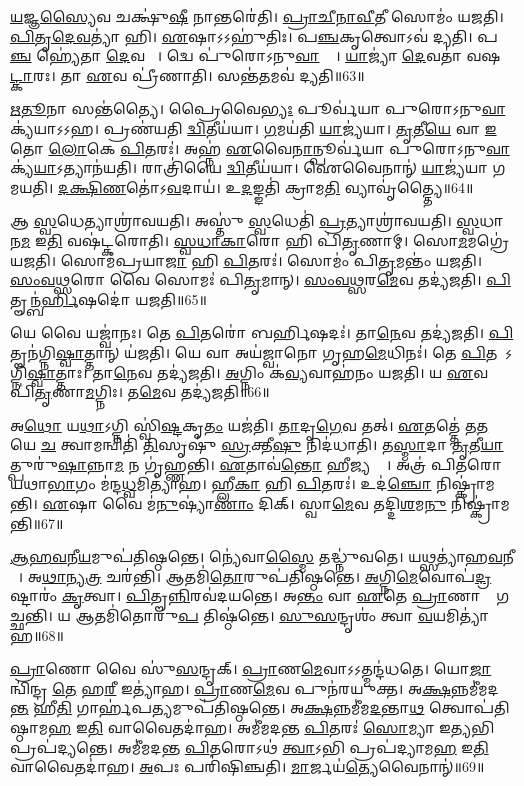 \ul{𑌯}𑌜𑍍𑌞\ul{𑌸𑍍𑌯𑍈}𑌵 𑌚𑌕𑍍𑌷𑍁॑\ul{𑌷𑍀} 𑌨𑌾𑌨𑍍𑌤𑌰𑍇॑𑌤𑌿।
\ul{𑌪𑍍𑌰𑌾}\ul{𑌚𑍀}\ul{𑌨𑌾}\ul{𑌵𑍀}𑌤𑍀 𑌸𑍋𑌮𑌂॑ 𑌯𑌜𑌤𑌿।
\ul{𑌪𑌿}\ul{𑌤𑍃}\ul{𑌦𑍇}\ul{𑌵}𑌤𑍍𑌯𑌾॑ 𑌹𑌿।
\ul{𑌏}𑌷𑌾𑌽𑌽𑌹𑍁॑𑌤𑌿𑌃।
𑌪\ul{𑌞𑍍𑌚}𑌕𑍃𑌤𑍍𑌵𑍋𑌽𑌵॑ 𑌦𑍍𑌯𑌤𑌿।
𑌪\ul{𑌞𑍍𑌚} 𑌹𑍍𑌯𑍇॑𑌤𑌾 \ul{𑌦𑍇}𑌵𑌤𑌾𑌃᳚।
𑌦𑍍𑌵𑍇 𑌪𑍁॑𑌰𑍋\-𑌽𑌨𑍁\ul{𑌵𑌾}𑌕𑍍𑌯𑍇᳚।
\ul{𑌯𑌾}𑌜𑍍𑌯𑌾॑ \ul{𑌦𑍇}𑌵𑌤𑌾॑ 𑌵𑌷\ul{𑌟𑍍𑌕𑌾}𑌰𑌃।
𑌤𑌾 \ul{𑌏}𑌵 𑌪𑍍𑌰𑍀॑𑌣𑌾𑌤𑌿।
𑌸𑌨𑍍𑌤॑\ul{𑌤}𑌮𑌵॑ 𑌦𑍍𑌯𑌤𑌿॥63॥

\ul{𑌋}\ul{𑌤𑍂}𑌨𑌾 𑌸𑌨𑍍𑌤॑𑌤𑍍𑌯𑍈।
𑌪𑍍𑌰𑍈𑌵𑍈\ul{𑌭𑍍𑌯𑌃} 𑌪𑍂𑌰𑍍𑌵॑𑌯𑌾 𑌪𑍁𑌰𑍋\-𑌽𑌨𑍁\ul{𑌵𑌾}𑌕𑍍𑌯॑𑌯𑌾𑌽𑌽𑌹।
𑌪𑍍𑌰𑌣॑𑌯𑌤𑌿 \ul{𑌦𑍍𑌵𑌿}𑌤𑍀𑌯॑𑌯𑌾।
\ul{𑌗}𑌮𑌯॑𑌤𑌿 \ul{𑌯𑌾}𑌜𑍍𑌯॑𑌯𑌾।
\ul{𑌤𑍃}𑌤𑍀\ul{𑌯𑍇} 𑌵𑌾 \ul{𑌇}𑌤𑍋 \ul{𑌲𑍋}𑌕𑍇 \ul{𑌪𑌿}𑌤𑌰𑌃॑।
𑌅𑌹𑍍𑌨॑ \ul{𑌏}𑌵𑍈\ul{𑌨𑌾}𑌨𑍍𑌪𑍂𑌰𑍍𑌵॑𑌯𑌾 𑌪𑍁𑌰𑍋\-𑌽𑌨𑍁\ul{𑌵𑌾}𑌕𑍍𑌯॑\ul{𑌯𑌾}\-𑌽𑌤𑍍𑌯𑌾𑌨॑𑌯𑌤𑌿।
𑌰𑌾𑌤𑍍𑌰𑌿॑𑌯𑍈 \ul{𑌦𑍍𑌵𑌿}𑌤𑍀𑌯॑𑌯𑌾।
𑌐𑌵𑍈𑌨𑌾𑌨𑍍॑ \ul{𑌯𑌾}𑌜𑍍𑌯॑𑌯𑌾 𑌗𑌮𑌯𑌤𑌿।
\ul{𑌦}\ul{𑌕𑍍𑌷𑌿}\ul{𑌣}𑌤𑍋॑\-𑌽\ul{𑌵}𑌦𑌾𑌯॑।
𑌉\ul{𑌦}𑌙𑍍𑌙𑌤𑌿॑ 𑌕𑍍𑌰𑌾𑌮\ul{𑌤𑌿} 𑌵𑍍𑌯𑌾𑌵𑍃॑𑌤𑍍𑌤𑍍𑌯𑍈॥64॥

𑌆 \ul{𑌸𑍍𑌵}𑌧𑍇𑌤𑍍𑌯𑌾𑌶𑍍𑌰𑌾॑𑌵𑌯𑌤𑌿।
𑌅𑌸𑍍𑌤𑍁॑ \ul{𑌸𑍍𑌵}𑌧𑍇𑌤𑌿॑ \ul{𑌪𑍍𑌰}𑌤𑍍𑌯𑌾𑌶𑍍𑌰𑌾॑𑌵𑌯𑌤𑌿।
\ul{𑌸𑍍𑌵}𑌧𑌾 𑌨\ul{𑌮} 𑌇\ul{𑌤𑌿} 𑌵𑌷॑𑌟𑍍𑌕𑌰𑍋𑌤𑌿।
\ul{𑌸𑍍𑌵}\ul{𑌧𑌾}\ul{𑌕𑌾}𑌰𑍋 𑌹𑌿 𑌪𑌿॑\ul{𑌤𑍃}𑌣𑌾𑌮𑍍।
𑌸𑍋\ul{𑌮}𑌮𑌗𑍍𑌰𑍇॑ 𑌯𑌜𑌤𑌿।
𑌸𑍋𑌮॑𑌪𑍍𑌰𑌯𑌾\ul{𑌜𑌾} 𑌹𑌿 \ul{𑌪𑌿}𑌤𑌰𑌃॑।
𑌸𑍋𑌮𑌂॑ 𑌪𑌿\ul{𑌤𑍃}𑌮𑌨𑍍𑌤𑌂॑ 𑌯𑌜𑌤𑌿।
\ul{𑌸𑌂}\ul{𑌵}\ul{𑌥𑍍𑌸}𑌰𑍋 𑌵𑍈 𑌸𑍋𑌮𑌃॑ 𑌪𑌿\ul{𑌤𑍃}𑌮𑌾𑌨𑍍।
\ul{𑌸𑌂}\ul{𑌵}\ul{𑌥𑍍𑌸}𑌰\ul{𑌮𑍇}𑌵 𑌤𑌦𑍍𑌯॑𑌜𑌤𑌿।
\ul{𑌪𑌿}𑌤𑍄𑌨𑍍𑌬॑\ul{𑌰𑍍𑌹𑌿}𑌷𑌦𑍋॑ 𑌯𑌜𑌤𑌿॥65॥

𑌯𑍇 𑌵𑍈 𑌯𑌜𑍍𑌵𑌾॑𑌨𑌃।
𑌤𑍇 \ul{𑌪𑌿}𑌤𑌰𑍋॑ 𑌬𑌰𑍍\mbox{}\ul{𑌹𑌿}𑌷𑌦𑌃॑।
𑌤𑌾\ul{𑌨𑍇}𑌵 𑌤𑌦𑍍𑌯॑𑌜𑌤𑌿।
\ul{𑌪𑌿}𑌤𑍄𑌨॑𑌗𑍍𑌨𑌿\ul{𑌷𑍍𑌵𑌾}𑌤𑍍𑌤𑌾𑌨𑍍 𑌯॑𑌜𑌤𑌿।
𑌯𑍇 𑌵𑌾 𑌅𑌯॑𑌜𑍍𑌵𑌾𑌨𑍋 𑌗𑍃𑌹\ul{𑌮𑍇}𑌧𑌿𑌨𑌃॑।
𑌤𑍇 \ul{𑌪𑌿}𑌤𑌰𑍋᳚\-𑌽𑌗𑍍𑌨𑌿\ul{𑌷𑍍𑌵𑌾}𑌤𑍍𑌤𑌾𑌃।
𑌤𑌾\ul{𑌨𑍇}𑌵 𑌤𑌦𑍍𑌯॑𑌜𑌤𑌿।
\ul{𑌅}𑌗𑍍𑌨𑌿𑌂 𑌕॑\ul{𑌵𑍍𑌯}𑌵𑌾𑌹॑𑌨𑌂 𑌯𑌜𑌤𑌿।
𑌯 \ul{𑌏}𑌵 𑌪𑌿॑\ul{𑌤𑍃}𑌣𑌾\ul{𑌮}𑌗𑍍𑌨𑌿𑌃।
𑌤\ul{𑌮𑍇}𑌵 𑌤𑌦𑍍𑌯॑𑌜𑌤𑌿॥66॥

𑌅\ul{𑌥𑍋} 𑌯\ul{𑌥𑌾}\-𑌽𑌗𑍍𑌨𑌿 𑌸𑍍𑌵𑌿॑\ul{𑌷𑍍𑌟}𑌕𑍃\ul{𑌤𑌂} 𑌯𑌜॑𑌤𑌿।
\ul{𑌤𑌾}𑌦𑍃\ul{𑌗𑍇}𑌵 𑌤𑌤𑍍।
\ul{𑌏}𑌤𑌤𑍍𑌤𑍇॑ 𑌤\ul{𑌤} 𑌯𑍇 \ul{𑌚} 𑌤𑍍𑌵𑌾𑌮𑌨𑍍𑌵𑌿𑌤𑌿॑ \ul{𑌤𑌿}𑌸𑍃𑌷𑍁॑ \ul{𑌸𑍍𑌰}𑌕𑍍𑌤𑍀\ul{𑌷𑍁} 𑌨𑌿𑌦॑𑌧𑌾𑌤𑌿।
𑌤\ul{𑌸𑍍𑌮𑌾}𑌦𑌾 \ul{𑌤𑍃}𑌤𑍀\ul{𑌯𑌾}𑌤𑍍𑌪𑍁𑌰𑍁॑\ul{𑌷𑌾}𑌨𑍍𑌨𑌾\ul{𑌮} 𑌨 𑌗𑍃॑𑌹𑍍𑌣𑌨𑍍𑌤𑌿।
\ul{𑌏}𑌤𑌾𑌵॑\ul{𑌨𑍍𑌤𑍋} 𑌹𑍀𑌜𑍍𑌯𑌨𑍍𑌤𑍇᳚।
𑌅𑌤𑍍𑌰॑ 𑌪𑌿𑌤𑌰𑍋 𑌯𑌥𑌾\ul{𑌭𑌾}𑌗𑌂 𑌮॑𑌨𑍍𑌦\ul{𑌧𑍍𑌵}𑌮𑌿𑌤𑍍𑌯𑌾॑𑌹।
𑌹𑍍𑌲𑍀\ul{𑌕𑌾} 𑌹𑌿 \ul{𑌪𑌿}𑌤𑌰𑌃॑।
𑌉𑌦॑\ul{𑌞𑍍𑌚𑍋} 𑌨𑌿𑌷𑍍𑌕𑍍𑌰𑌾॑𑌮𑌨𑍍𑌤𑌿।
\ul{𑌏}𑌷𑌾 𑌵𑍈 𑌮॑\ul{𑌨𑍁}𑌷𑍍𑌯𑌾॑\ul{𑌣𑌾𑌂} 𑌦𑌿𑌕𑍍।
𑌸𑍍𑌵𑌾\ul{𑌮𑍇}𑌵 𑌤𑌦𑍍𑌦𑌿\ul{𑌶}𑌮\ul{𑌨𑍁} 𑌨𑌿𑌷𑍍𑌕𑍍𑌰𑌾॑𑌮𑌨𑍍𑌤𑌿॥67॥

\ul{𑌆}\ul{𑌹}\ul{𑌵}𑌨𑍀\ul{𑌯}𑌮𑍁𑌪॑𑌤𑌿𑌷𑍍𑌠𑌨𑍍𑌤𑍇।
𑌨𑍍𑌯𑍇॑𑌵𑌾\ul{𑌸𑍍𑌮𑍈} 𑌤𑌦𑍍𑌧𑍍𑌨𑍁॑𑌵𑌤𑍇।
𑌯\ul{𑌥𑍍𑌸}𑌤𑍍𑌯𑌾॑𑌹\ul{𑌵}𑌨𑍀𑌯𑍇᳚।
𑌅\ul{𑌥𑌾}𑌨𑍍𑌯\ul{𑌤𑍍𑌰} 𑌚𑌰॑𑌨𑍍𑌤𑌿।
𑌆𑌤𑌮𑌿॑\ul{𑌤𑍋}𑌰𑍁𑌪॑𑌤𑌿𑌷𑍍𑌠𑌨𑍍𑌤𑍇।
\ul{𑌅}𑌗𑍍𑌨𑌿\ul{𑌮𑍇}𑌵𑍋𑌪॑\ul{𑌦𑍍𑌰}𑌷𑍍𑌟𑌾𑌰𑌂॑ \ul{𑌕𑍃}𑌤𑍍𑌵𑌾।
\ul{𑌪𑌿}𑌤𑍄\ul{𑌨𑍍𑌨𑌿}𑌰𑌵॑𑌦𑌯𑌨𑍍𑌤𑍇।
𑌅\ul{𑌨𑍍𑌤𑌂} 𑌵𑌾 \ul{𑌏}𑌤𑍇 \ul{𑌪𑍍𑌰𑌾}𑌣𑌾𑌨𑌾𑌂᳚ 𑌗𑌚𑍍𑌛𑌨𑍍𑌤𑌿।
𑌯 𑌆𑌤𑌮𑌿॑𑌤𑍋𑌰𑍁\ul{𑌪} 𑌤𑌿𑌷𑍍𑌠॑𑌨𑍍𑌤𑍇।
\ul{𑌸𑍁}\ul{𑌸}𑌨𑍍𑌦𑍃𑌶𑌂॑ 𑌤𑍍𑌵𑌾 \ul{𑌵}𑌯𑌮𑌿𑌤𑍍𑌯𑌾॑𑌹॥68॥

\ul{𑌪𑍍𑌰𑌾}𑌣𑍋 𑌵𑍈 𑌸𑍁॑\ul{𑌸}𑌨𑍍𑌦𑍃𑌕𑍍।
\ul{𑌪𑍍𑌰𑌾}𑌣\ul{𑌮𑍇}𑌵𑌾𑌽𑌽𑌤𑍍𑌮𑌨𑍍𑌦॑𑌧𑌤𑍇।
𑌯𑍋\ul{𑌜𑌾} 𑌨𑍍𑌵𑌿॑𑌨𑍍𑌦𑍍𑌰 \ul{𑌤𑍇} 𑌹\ul{𑌰𑍀} 𑌇𑌤𑍍𑌯𑌾॑𑌹।
\ul{𑌪𑍍𑌰𑌾}𑌣\ul{𑌮𑍇}𑌵 𑌪𑍁𑌨॑𑌰𑌯𑍁𑌕𑍍𑌤।
𑌅\ul{𑌕𑍍𑌷}𑌨𑍍𑌨𑌮𑍀॑𑌮𑌦\ul{𑌨𑍍𑌤} 𑌹𑍀\ul{𑌤𑌿} 𑌗𑌾𑌰𑍍\mbox{}𑌹॑𑌪\ul{𑌤𑍍𑌯}𑌮𑍁𑌪॑𑌤𑌿𑌷𑍍𑌠𑌨𑍍𑌤𑍇।
𑌅\ul{𑌕𑍍𑌷}𑌨𑍍𑌨𑌮𑍀॑𑌮\ul{𑌦}𑌨𑍍𑌤𑌾\ul{𑌥} 𑌤𑍍𑌵𑍋𑌪॑𑌤𑌿𑌷𑍍𑌠𑌾𑌮\ul{𑌹} 𑌇\ul{𑌤𑌿} 𑌵𑌾𑌵𑍈𑌤𑌦𑌾॑𑌹।
𑌅𑌮𑍀॑𑌮𑌦𑌨𑍍𑌤 \ul{𑌪𑌿}𑌤𑌰𑌃॑ \ul{𑌸𑍋}𑌮𑍍𑌯𑌾 𑌇\ul{𑌤𑍍𑌯}𑌭𑌿 𑌪𑍍𑌰𑌪॑𑌦𑍍𑌯𑌨𑍍𑌤𑍇।
𑌅𑌮𑍀॑𑌮𑌦𑌨𑍍𑌤 \ul{𑌪𑌿}𑌤𑌰𑍋𑌽𑌥॑ \ul{𑌤𑍍𑌵𑌾}𑌽𑌭𑌿 𑌪𑍍𑌰𑌪॑𑌦𑍍𑌯𑌾𑌮\ul{𑌹} 𑌇\ul{𑌤𑌿} 𑌵𑌾𑌵𑍈𑌤𑌦𑌾॑𑌹।
\ul{𑌅}𑌪𑌃 𑌪𑌰𑌿॑𑌷𑌿𑌞𑍍𑌚𑌤𑌿।
\ul{𑌮𑌾}𑌰𑍍𑌜𑌯॑\ul{𑌤𑍍𑌯𑍇}𑌵𑍈𑌨𑌾𑌨𑍍॑॥69॥

